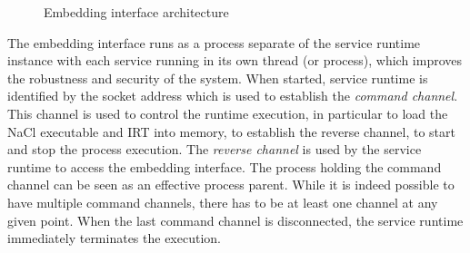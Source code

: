 


\begin{figure}
\centering
\caption{Embedding interface architecture}
\label{fig:architecture}
\end{figure}

The embedding interface runs as a process separate of the service
runtime instance with each service running in its own thread (or
process), which improves the robustness and security of the system. When
started, service runtime is identified by the socket address which is
used to establish the \emph{command channel}. This channel is used to
control the runtime execution, in particular to load the NaCl executable
and IRT into memory, to establish the reverse channel, to start and stop
the process execution.  The \emph{reverse channel} is used by the
service runtime to access the embedding interface. The process holding
the command channel can be seen as an effective process parent. While it
is indeed possible to have multiple command channels, there has to be at
least one channel at any given point.  When the last command channel is
disconnected, the service runtime immediately terminates the execution.


